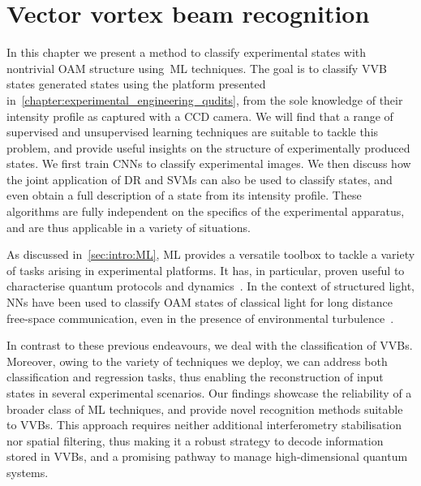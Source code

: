 
\chapter{Vector vortex beam recognition}
\label{chapter:ML_VVBs}

In this chapter we present a method to classify experimental states with nontrivial \ac{OAM} structure using~\acf{ML} techniques.
The goal is to classify \ac{VVB} states generated states using the platform presented in~\cref{chapter:experimental_engineering_qudits}, from the sole knowledge of their intensity profile as captured with a CCD camera.
We will find that a range of supervised and unsupervised learning techniques are suitable to tackle this problem, and provide useful insights on the structure of experimentally produced states.
We first train \acp{CNN} to classify experimental images.
We then discuss how the joint application of \ac{DR} and \acp{SVM} can also be used to classify states, and even obtain a full description of a state from its intensity profile.
These algorithms are fully independent on the specifics of the experimental apparatus, and are thus applicable in a variety of situations.

As discussed in~\cref{sec:intro:ML}, \ac{ML} provides a versatile toolbox to tackle a variety of tasks arising in experimental platforms. It has, in particular, proven useful to characterise quantum protocols and dynamics~\cite{carrasquilla2019reconstructing,giordani2018experimental, agresti2019pattern,lumino2018experimental,rocchetto2019experimental,butler2018machine,fischer2006predicting,melnikov2018active,wang2017experimental}.
In the context of structured light, \acp{NN} have been used to classify \ac{OAM} states of classical light for long distance free-space communication, even in the presence of environmental turbulence~\cite{krenn2014communication,krenn2016twisted,doster2017machine,park2018demultiplexing,lohani2018turbulence,li2018joint}.

In contrast to these previous endeavours, we deal with the classification of \acp{VVB}. Moreover, owing to the variety of techniques we deploy, we can address both classification and regression tasks, thus enabling the reconstruction of input states in several experimental scenarios.
Our findings showcase the reliability of a broader class of ML techniques, and provide novel recognition methods suitable to \acp{VVB}.
This approach requires neither additional interferometry stabilisation nor spatial filtering, thus making it a robust strategy to decode information stored in \acp{VVB}, and a promising pathway to manage high-dimensional quantum systems. 

